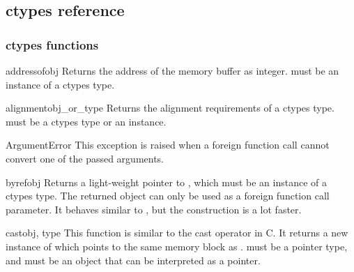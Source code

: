 \subsection{ctypes reference\label{ctypes-reference}}

\subsubsection{ctypes functions}

\begin{funcdesc}{addressof}{obj}
Returns the address of the memory buffer as integer.   must
be an instance of a ctypes type.
\end{funcdesc}

\begin{funcdesc}{alignment}{obj_or_type}
Returns the alignment requirements of a ctypes type.
 must be a ctypes type or an instance.
\end{funcdesc}

\begin{excclassdesc}{ArgumentError}{}
This exception is raised when a foreign function call cannot convert
one of the passed arguments.
\end{excclassdesc}

\begin{funcdesc}{byref}{obj}
Returns a light-weight pointer to , which must be an instance
of a ctypes type.  The returned object can only be used as a foreign
function call parameter.  It behaves similar to ,
but the construction is a lot faster.
\end{funcdesc}

\begin{funcdesc}{cast}{obj, type}
This function is similar to the cast operator in C.  It returns a new
instance of  which points to the same memory block as
.   must be a pointer type, and 
 must be an object that can be interpreted as a pointer.
\end{funcdesc}


